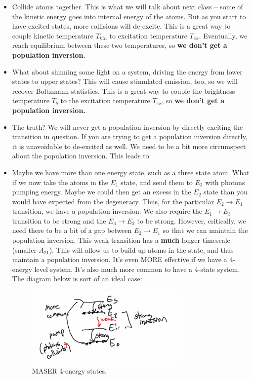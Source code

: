 \documentclass{article}
\def\ato{{A_{21}}}
\def\ato{{A_{21}}}
\def\ato{{A_{21}}}
\begin{document}
\begin{itemize}
    \item Collide atoms together. This is what we will talk about next class -- some of the kinetic energy goes into internal energy of the atoms. But as you start to have excited states, more collisions will de-excite. This is a great way to couple kinetic temperature $T_{kin}$ to excitation temperature $T_{ex}$. Eventually, we reach equilibrium between these two temperatures, so \textbf{we don't get a population inversion.}
    
    \item What about shinning some light on a system, driving the energy from lower states to upper states? This will cause stimulated emission, too, so we will recover Boltzmann statistics. This is a great way to couple the brightness temperature $T_{b}$ to the excitation temperature $T_{ex}$, so \textbf{we don't get a population inversion.}
    
    \item The truth? We will never get a population inversion by directly exciting the transition in question. If you are trying to get a population inversion directly, it is unavoidable to de-excited as well. We need to be a bit more circumspect about the population inversion. This leads to:
    
    \item Maybe we have more than one energy state, such as a three state atom. What if we now take the atoms in the $E_1$ state, and send them to $E_3$ with photons pumping energy. Maybe we could then get an excess in the $E_2$ state than you would have expected from the degeneracy. Thus, for the particular $E_2\rightarrow E_1$ transition, we have a population inversion. We also require the $E_1\rightarrow E_3$ transition to be strong and the $E_3\rightarrow E_2$ to be strong. However, critically, we need there to be a bit of a gap between $E_2\rightarrow E_1$ so that we can maintain the population inversion. This weak transition has a \textbf{much} longer timescale (smaller $\ato$). This will allow us to build up atoms in the state, and thus maintain a population inversion. It's even MORE effective if we have a 4-energy level system. It's also much more common to have a 4-state system. The diagram below is sort of an ideal case: 
    
    \begin{figure}
        \centering
        \includegraphics[width=0.75\textwidth]{Screen Shot 2020-10-06 at 12.13.06 PM.png}
        \caption{MASER 4-energy states.}
        \label{fig:inv}
    \end{figure}
    

\end{itemize}
\end{document}
